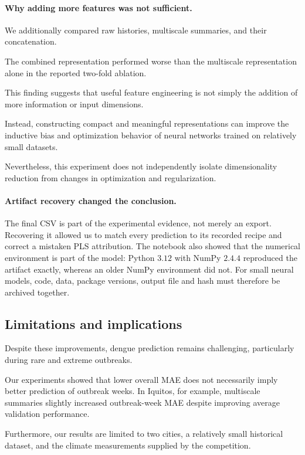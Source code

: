 \documentclass[11pt,a4paper]{article}
\begin{document}
\paragraph{Why adding more features was not sufficient.}

We additionally compared raw histories,
multiscale summaries, and their concatenation.

The combined representation performed worse
than the multiscale representation alone
in the reported two-fold ablation.

This finding suggests that useful feature
engineering is not simply the addition of
more information or input dimensions.

Instead, constructing compact and meaningful
representations can improve the inductive bias
and optimization behavior of neural networks
trained on relatively small datasets.

Nevertheless, this experiment does not
independently isolate dimensionality reduction
from changes in optimization and regularization.

\paragraph{Artifact recovery changed the conclusion.}

The final CSV is part of the experimental evidence,
not merely an export. Recovering it allowed us to
match every prediction to its recorded recipe and
correct a mistaken PLS attribution. The notebook
also showed that the numerical environment is part
of the model: Python $3.12$ with NumPy $2.4.4$
reproduced the artifact exactly, whereas an older
NumPy environment did not. For small neural models,
code, data, package versions, output file and hash
must therefore be archived together.

\subsection{Limitations and implications}

Despite these improvements, dengue prediction
remains challenging, particularly during rare
and extreme outbreaks.

Our experiments showed that lower overall MAE
does not necessarily imply better prediction
of outbreak weeks. In Iquitos, for example,
multiscale summaries slightly increased
outbreak-week MAE despite improving average
validation performance.

Furthermore, our results are limited to two
cities, a relatively small historical dataset,
and the climate measurements supplied by the
competition.
\end{document}
